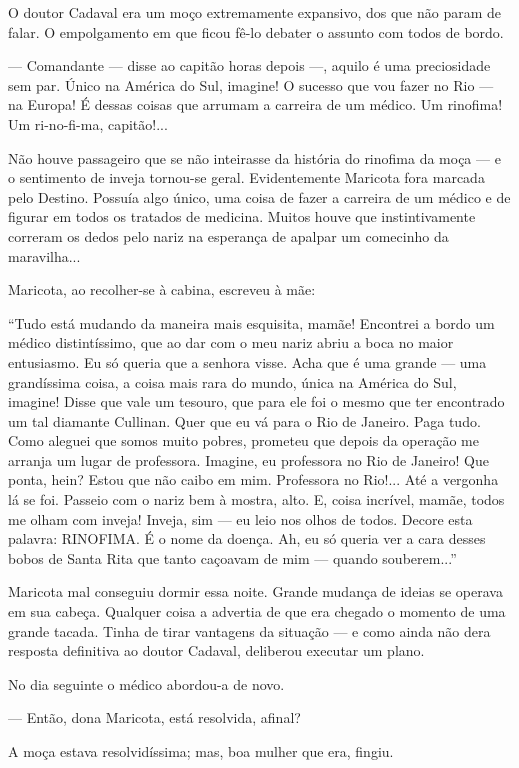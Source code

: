 O doutor Cadaval era um moço extremamente expansivo, dos que não param
de falar. O empolgamento em que ficou fê-lo debater o assunto com todos
de bordo.

--- Comandante --- disse ao capitão horas depois ---, aquilo é uma
preciosidade sem par. Único na América do Sul, imagine! O sucesso que
vou fazer no Rio --- na Europa! É dessas coisas que arrumam a carreira
de um médico. Um rinofima! Um ri-no-fi-ma, capitão!...

Não houve passageiro que se não inteirasse da história do rinofima da
moça --- e o sentimento de inveja tornou-se geral. Evidentemente
Maricota fora marcada pelo Destino. Possuía algo único, uma coisa de
fazer a carreira de um médico e de figurar em todos os tratados de
medicina. Muitos houve que instintivamente correram os dedos pelo nariz
na esperança de apalpar um comecinho da maravilha...

Maricota, ao recolher-se à cabina, escreveu à mãe:

``Tudo está mudando da maneira mais esquisita, mamãe! Encontrei a bordo
um médico distintíssimo, que ao dar com o meu nariz abriu a boca no
maior entusiasmo. Eu só queria que a senhora visse. Acha que é uma
grande --- uma grandíssima coisa, a coisa mais rara do mundo, única na
América do Sul, imagine! Disse que vale um tesouro, que para ele foi o
mesmo que ter encontrado um tal diamante Cullinan. Quer que eu vá para o
Rio de Janeiro. Paga tudo. Como aleguei que somos muito pobres, prometeu
que depois da operação me arranja um lugar de professora. Imagine, eu
professora no Rio de Janeiro! Que ponta, hein? Estou que não caibo em
mim. Professora no Rio!... Até a vergonha lá se foi. Passeio com o nariz
bem à mostra, alto. E, coisa incrível, mamãe, todos me olham com inveja!
Inveja, sim --- eu leio nos olhos de todos. Decore esta palavra:
RINOFIMA. É o nome da doença. Ah, eu só queria ver a cara desses bobos
de Santa Rita que tanto caçoavam de mim --- quando souberem...''

Maricota mal conseguiu dormir essa noite. Grande mudança de ideias se
operava em sua cabeça. Qualquer coisa a advertia de que era chegado o
momento de uma grande tacada. Tinha de tirar vantagens da situação --- e
como ainda não dera resposta definitiva ao doutor Cadaval, deliberou
executar um plano.

No dia seguinte o médico abordou-a de novo.

--- Então, dona Maricota, está resolvida, afinal?

A moça estava resolvidíssima; mas, boa mulher que era, fingiu.

